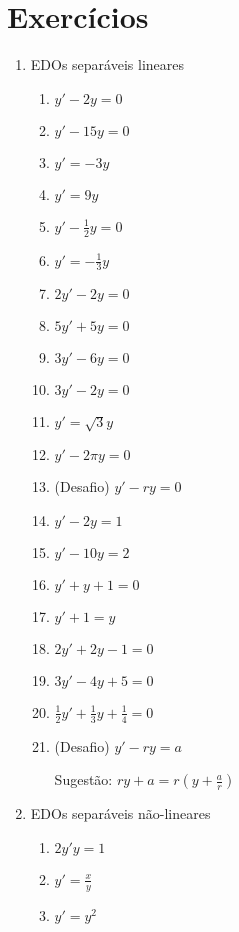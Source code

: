 \documentclass[a4paper]{article}
\begin{document}
\section{Exercícios}

\begin{enumerate}

\item EDOs separáveis lineares
  \begin{enumerate}
  \item $y' -2y = 0$
  \item $y' -15y = 0$
  \item $y' = -3y$
  \item $y' = 9y$
  \item $y' - \frac{1}{2} y = 0$
  \item $y' = -\frac{1}{3} y$
  \item $2y' - 2y = 0$
  \item $5y' +5y =0 $
  \item $3y' -6y = 0 $
  \item $3y' -2y =0$
  \item $y' = \sqrt{3}y$
  \item $y' -2\pi y =0$
  \item (Desafio) $y' - ry = 0$
  \item $y' - 2y = 1$
  \item $y' - 10y = 2$
  \item $y' + y + 1 = 0$
  \item $y' + 1 = y$
  \item $2y' + 2y -1 = 0$
  \item $3y'- 4y +5 = 0$
  \item $\frac{1}{2} y' + \frac{1}{3} y + \frac{1}{4} = 0$
  \item (Desafio) $y' -ry = a$

Sugestão: $ry+a = r(y+\frac{a}{r})$
  \end{enumerate}

\item EDOs separáveis não-lineares
  \begin{enumerate}
  \item $2y'y = 1$
  \item $y' = \frac{x}{y}$
  \item $y' = y^2$
  \end{enumerate}

\end{enumerate}
\end{document}
